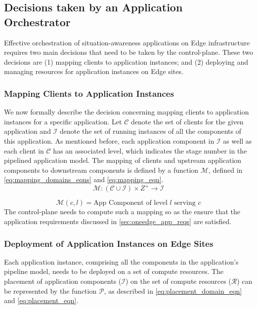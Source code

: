 \subsection{Decisions taken by an Application Orchestrator}
\label{sec:app_orch_decisions}
Effective orchestration of situation-awareness applications on Edge infrastructure requires two main decisions that need to be taken by the control-plane. These two decisions are (1) mapping clients to application instances; and (2) deploying and managing resources for application instances on Edge sites.

\subsubsection{Mapping Clients to Application Instances}
\newcommand{\clientset}{\mathcal{C}}
\newcommand{\instanceset}{\mathcal{I}}
\newcommand{\resourceset}{\mathcal{R}}

We now formally describe the decision concerning mapping clients to application instances for a specific application. Let $\clientset$ denote the set of clients for the given application and $\instanceset$ denote the set of running instances of all the components of this application. As mentioned before, each application component in $\instanceset$ as well as each client in $\clientset$ has an associated level, which indicates the stage number in the pipelined application model. The mapping of clients and upstream application components to downstream components is defined by a function $\mathcal{M}$, defined in \cref{eq:mapping_domains_eqns} and \cref{eq:mapping_eqn}.
\begin{equation}
\label{eq:mapping_domains_eqns}
\mathcal{M} : \left( \clientset \cup \instanceset \right) \times Z^+ \rightarrow \instanceset
\end{equation}

\begin{equation}
\label{eq:mapping_eqn}
\mathcal{M} \left( c, l \right) = \text{App Component of level }l \text{ serving }c
\end{equation}
The control-plane needs to compute such a mapping so as the ensure that the application requirements discussed in \cref{sec:oneedge_app_reqs} are satisfied.

\subsubsection{Deployment of Application Instances on Edge Sites}
Each application instance, comprising all the components in the application's pipeline model, needs to be deployed on a set of compute resources. The placement of application components ($\instanceset$) on the set of compute resources ($\resourceset$) can be represented by the function $\mathcal{P}$, as described in \cref{eq:placement_domain_eqn} and \cref{eq:placement_eqn}.

